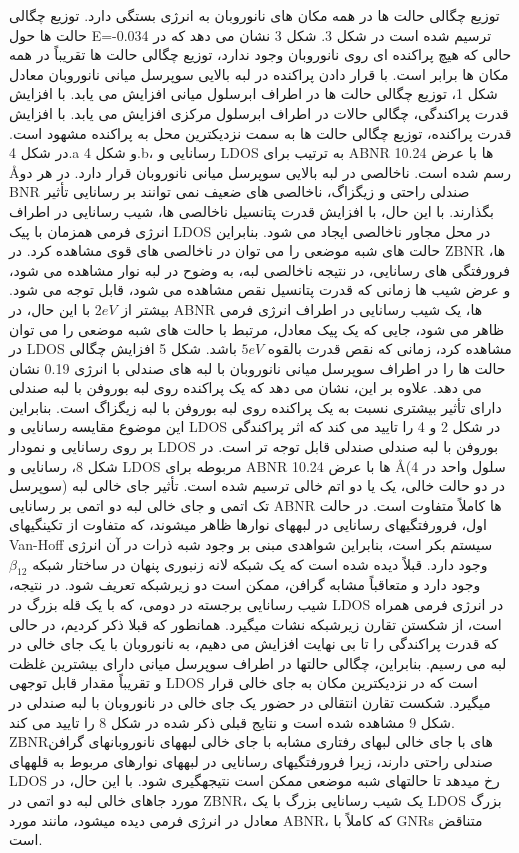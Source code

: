 توزیع چگالی حالت ها در همه مکان های نانوروبان به انرژی بستگی دارد. توزیع چگالی حالت ها حول E=-0.034 ترسیم شده است در شکل 3. شکل 3 نشان می دهد که در حالی که هیچ پراکنده ای روی نانوروبان وجود ندارد، توزیع چگالی حالت ها تقریباً در همه مکان ها برابر است. با قرار دادن پراکنده در لبه بالایی سوپرسل میانی نانوروبان معادل شکل 1، توزیع چگالی حالت ها در اطراف ابرسلول میانی افزایش می یابد. با افزایش قدرت پراکندگی، چگالی حالات در اطراف ابرسلول مرکزی افزایش می یابد. با افزایش قدرت پراکنده، توزیع چگالی حالت ها به سمت نزدیکترین محل به پراکنده مشهود است. در شکل 4.a و شکل 4.b، رسانایی و LDOS به ترتیب برای ABNR ها با عرض 10.24 \AA رسم شده است. ناخالصی در لبه بالایی سوپرسل میانی نانوروبان قرار دارد. در هر دو BNR صندلی راحتی و زیگزاگ، ناخالصی های ضعیف نمی توانند بر رسانایی تأثیر بگذارند. با این حال، با افزایش قدرت پتانسیل ناخالصی ها، شیب رسانایی در اطراف انرژی فرمی همزمان با پیک LDOS در محل مجاور ناخالصی ایجاد می شود. بنابراین حالت های شبه موضعی را می توان در ناخالصی های قوی مشاهده کرد. در ZBNR ها، فرورفتگی های رسانایی، در نتیجه ناخالصی لبه، به وضوح در لبه نوار مشاهده می شود، و عرض شیب ها زمانی که قدرت پتانسیل نقص مشاهده می شود، قابل توجه می شود. بیشتر از $2 eV$ با این حال، در ABNR ها، یک شیب رسانایی در اطراف انرژی فرمی ظاهر می شود، جایی که یک پیک معادل، مرتبط با حالت های شبه موضعی را می توان در LDOS مشاهده کرد، زمانی که نقص قدرت بالقوه $5 eV$ باشد. شکل 5 افزایش چگالی حالت ها را در اطراف سوپرسل میانی نانوروبان با لبه های صندلی با انرژی 0.19 نشان می دهد. علاوه بر این، نشان می دهد که یک پراکنده روی لبه بوروفن با لبه صندلی دارای تأثیر بیشتری نسبت به یک پراکنده روی لبه بوروفن با لبه زیگزاگ است. بنابراین این موضوع مقایسه رسانایی و LDOS در شکل 2 و 4 را تایید می کند که اثر پراکندگی بر روی رسانایی و نمودار LDOS بوروفن با لبه صندلی صندلی قابل توجه تر است. در شکل 8، رسانایی و LDOS مربوطه برای ABNR ها با عرض 10.24 \AA (4 سلول واحد در سوپرسل) در دو حالت خالی، یک یا دو اتم خالی ترسیم شده است. تأثیر جای خالی لبه تک اتمی و جای خالی لبه دو اتمی بر رسانایی ABNR ها کاملاً متفاوت است. در حالت اول، فرورفتگیهای رسانایی در لبههای نوارها ظاهر میشوند، که متفاوت از تکینگیهای Van-Hoff سیستم بکر است، بنابراین شواهدی مبنی بر وجود شبه ذرات در آن انرژی وجود دارد. قبلاً دیده شده است که یک شبکه لانه زنبوری پنهان در ساختار شبکه $\beta_{12}$ وجود دارد و متعاقباً مشابه گرافن، ممکن است دو زیرشبکه تعریف شود. در نتیجه، شیب رسانایی برجسته در دومی، که با یک قله بزرگ در LDOS در انرژی فرمی همراه است، از شکستن تقارن زیرشبکه نشات میگیرد. همانطور که قبلا ذکر کردیم، در حالی که قدرت پراکندگی را تا بی نهایت افزایش می دهیم، به نانوروبان با یک جای خالی در لبه می رسیم. بنابراین، چگالی حالتها در اطراف سوپرسل میانی دارای بیشترین غلظت و تقریباً مقدار قابل توجهی LDOS است که در نزدیکترین مکان به جای خالی قرار میگیرد. شکست تقارن انتقالی در حضور یک جای خالی در نانوروبان با لبه صندلی در شکل 9 مشاهده شده است و نتایج قبلی ذکر شده در شکل 8 را تایید می کند. ZBNRهای با جای خالی لبهای رفتاری مشابه با جای خالی لبههای نانوروبانهای گرافن صندلی راحتی دارند، زیرا فرورفتگیهای رسانایی در لبههای نوارهای مربوط به قلههای LDOS رخ میدهد تا حالتهای شبه موضعی ممکن است نتیجهگیری شود. با این حال، در مورد جاهای خالی لبه دو اتمی در ZBNR، یک شیب رسانایی بزرگ با یک LDOS بزرگ معادل در انرژی فرمی دیده میشود، مانند مورد ABNR، که کاملاً با GNRs متناقض است.

